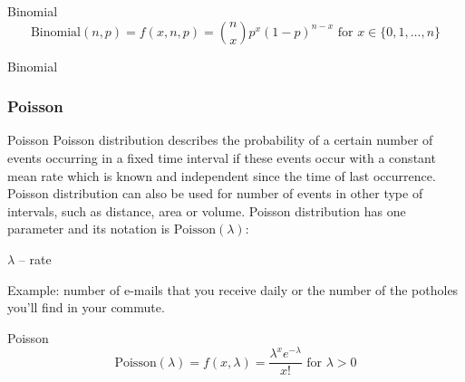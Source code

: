 \begin{frame}{Binomial}
	$$\text{Binomial}(n,p) = f(x, n, p) = \binom{n}{x}p^{x}(1-p)^{n-x} \text{ for $x \in \{0, 1, \dots, n\}$}$$
\end{frame}

\begin{frame}{Binomial}
	\centering
\end{frame}

\subsubsection{Poisson}
\begin{frame}{Poisson}
	Poisson distribution describes the probability of a certain number of
	events occurring in a fixed time interval if these events
	occur with a constant mean rate which is known and independent since
	the time of last occurrence.
	Poisson distribution can also be used for number of events in other
	type of intervals, such as distance, area or volume.
	\vfill
	Poisson distribution has one parameter and its notation is $\text{Poisson}(\lambda)$:
	\begin{vfilleditems}
		\item $\lambda$ -- rate
	\end{vfilleditems}
	\vfill
	Example: number of e-mails that you receive daily or the number of the potholes you'll find in your commute.
\end{frame}

\begin{frame}{Poisson}
	$$\text{Poisson}(\lambda) = f(x, \lambda) = \frac{\lambda^x e^{-\lambda}}{x!} \text{ for $\lambda > 0$}$$
\end{frame}


